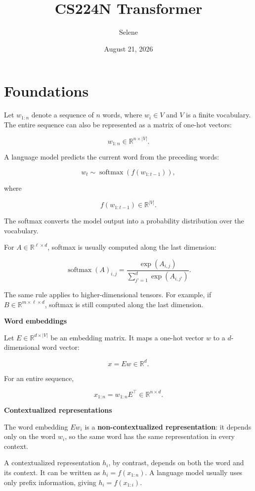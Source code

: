 \documentclass[
  a4paper,
  10pt]{article}
\title{CS224N \textbar{} Transformer}
\author{Selene}
\date{August 21, 2026}
\begin{document}
\maketitle

\section{Foundations}\label{foundations}

Let \(w_{1:n}\) denote a sequence of \(n\) words, where \(w_i\in V\) and
\(V\) is a finite vocabulary. The entire sequence can also be
represented as a matrix of one-hot vectors:

\[
w_{1:n}\in\mathbb{R}^{n\times\lvert V\rvert}.
\]

A language model predicts the current word from the preceding words:

\[
w_t\sim\operatorname{softmax}\left(f(w_{1:t-1})\right),
\]

where

\[
f(w_{1:t-1})\in\mathbb{R}^{\lvert V\rvert}.
\]

The softmax converts the model output into a probability distribution
over the vocabulary.

For \(A\in\mathbb{R}^{\ell\times d}\), softmax is usually computed along
the last dimension:

\[
\operatorname{softmax}(A)_{i,j}
=\frac{\exp(A_{i,j})}
{\sum_{j'=1}^{d}\exp(A_{i,j'})}.
\]

The same rule applies to higher-dimensional tensors. For example, if
\(B\in\mathbb{R}^{m\times\ell\times d}\), softmax is still computed
along the last dimension.

\textbf{Word embeddings}

Let \(E\in\mathbb{R}^{d\times\lvert V\rvert}\) be an embedding matrix.
It maps a one-hot vector \(w\) to a \(d\)-dimensional word vector:

\[
x=Ew\in\mathbb{R}^{d}.
\]

For an entire sequence,

\[
x_{1:n}=w_{1:n}E^\top\in\mathbb{R}^{n\times d}.
\]

\textbf{Contextualized representations}

The word embedding \(Ew_i\) is a \textbf{non-contextualized
representation}: it depends only on the word \(w_i\), so the same word
has the same representation in every context.

A contextualized representation \(h_i\), by contrast, depends on both
the word and its context. It can be written as \(h_i=f(x_{1:n})\). A
language model usually uses only prefix information, giving
\(h_i=f(x_{1:i})\).
\end{document}
